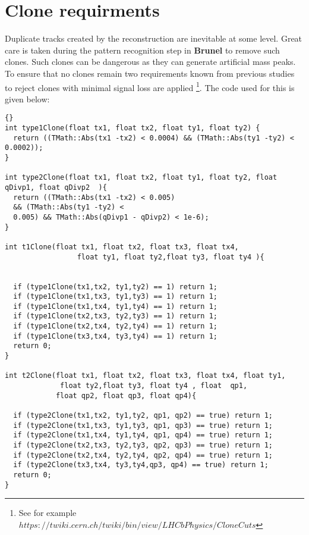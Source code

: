 \section{Clone requirments}
\label{sec:clones}
%
Duplicate tracks created by the reconstruction are inevitable at some
level. Great care is taken during the pattern recognition step in
\textbf{Brunel} to remove such clones. Such clones can be dangerous as
they can generate artificial mass peaks. To ensure that no clones
remain two requirements known from previous
studies to reject clones with minimal signal loss are applied \footnote{See for
example $https://twiki.cern.ch/twiki/bin/view/LHCbPhysics/CloneCuts$}. The code used for this is given below: 
%
\begin{scriptsize}
\begin{lstlisting}{}
int type1Clone(float tx1, float tx2, float ty1, float ty2) {
  return ((TMath::Abs(tx1 -tx2) < 0.0004) && (TMath::Abs(ty1 -ty2) < 0.0002));
}

int type2Clone(float tx1, float tx2, float ty1, float ty2, float qDivp1, float qDivp2  ){
  return ((TMath::Abs(tx1 -tx2) < 0.005)
  && (TMath::Abs(ty1 -ty2) <
  0.005) && TMath::Abs(qDivp1 - qDivp2) < 1e-6);
}

int t1Clone(float tx1, float tx2, float tx3, float tx4, 
                 float ty1, float ty2,float ty3, float ty4 ){

  
  if (type1Clone(tx1,tx2, ty1,ty2) == 1) return 1;
  if (type1Clone(tx1,tx3, ty1,ty3) == 1) return 1;   
  if (type1Clone(tx1,tx4, ty1,ty4) == 1) return 1;   
  if (type1Clone(tx2,tx3, ty2,ty3) == 1) return 1;  
  if (type1Clone(tx2,tx4, ty2,ty4) == 1) return 1;  
  if (type1Clone(tx3,tx4, ty3,ty4) == 1) return 1;  
  return 0;
}

int t2Clone(float tx1, float tx2, float tx3, float tx4, float ty1, 
             float ty2,float ty3, float ty4 , float  qp1, 
            float qp2, float qp3, float qp4){

  if (type2Clone(tx1,tx2, ty1,ty2, qp1, qp2) == true) return 1;
  if (type2Clone(tx1,tx3, ty1,ty3, qp1, qp3) == true) return 1;   
  if (type2Clone(tx1,tx4, ty1,ty4, qp1, qp4) == true) return 1;   
  if (type2Clone(tx2,tx3, ty2,ty3, qp2, qp3) == true) return 1;  
  if (type2Clone(tx2,tx4, ty2,ty4, qp2, qp4) == true) return 1;  
  if (type2Clone(tx3,tx4, ty3,ty4,qp3, qp4) == true) return 1;  
  return 0;
}
\end{lstlisting}{}
\end{scriptsize}

\clearpage

